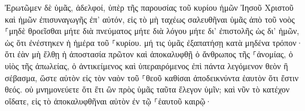 \documentclass{openreader}
\begin{document}
Ἐρωτῶμεν δὲ ὑμᾶς, ἀδελφοί, ὑπὲρ τῆς παρουσίας τοῦ κυρίου ἡμῶν Ἰησοῦ Χριστοῦ καὶ ἡμῶν ἐπισυναγωγῆς ἐπ’ αὐτόν, 
εἰς τὸ μὴ ταχέως σαλευθῆναι ὑμᾶς ἀπὸ τοῦ νοὸς ⸀μηδὲ θροεῖσθαι μήτε διὰ πνεύματος μήτε διὰ λόγου μήτε δι’ ἐπιστολῆς ὡς δι’ ἡμῶν, ὡς ὅτι ἐνέστηκεν ἡ ἡμέρα τοῦ ⸀κυρίου. 
μή τις ὑμᾶς ἐξαπατήσῃ κατὰ μηδένα τρόπον· ὅτι ἐὰν μὴ ἔλθῃ ἡ ἀποστασία πρῶτον καὶ ἀποκαλυφθῇ ὁ ἄνθρωπος τῆς ⸀ἀνομίας, ὁ υἱὸς τῆς ἀπωλείας, 
ὁ ἀντικείμενος καὶ ὑπεραιρόμενος ἐπὶ πάντα λεγόμενον θεὸν ἢ σέβασμα, ὥστε αὐτὸν εἰς τὸν ναὸν τοῦ ⸀θεοῦ καθίσαι ἀποδεικνύντα ἑαυτὸν ὅτι ἔστιν θεός. 
οὐ μνημονεύετε ὅτι ἔτι ὢν πρὸς ὑμᾶς ταῦτα ἔλεγον ὑμῖν; 
καὶ νῦν τὸ κατέχον οἴδατε, εἰς τὸ ἀποκαλυφθῆναι αὐτὸν ἐν τῷ ⸀ἑαυτοῦ καιρῷ· 
\end{document}
